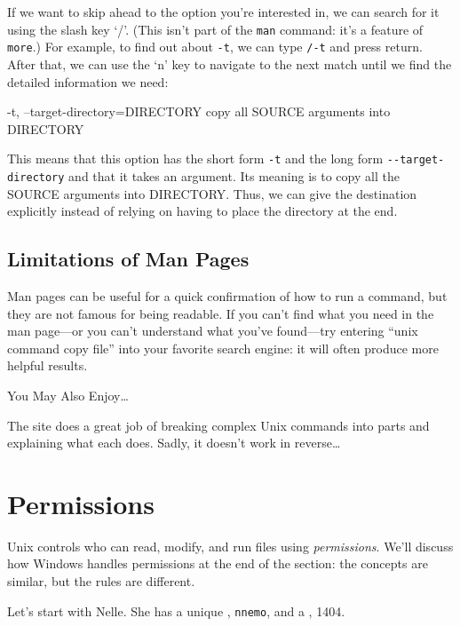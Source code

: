 If we want to skip ahead to the option you're interested in, we can
search for it using the slash key `/'. (This isn't part of the
\texttt{man} command: it's a feature of \texttt{more}.) For example, to
find out about \texttt{-t}, we can type \texttt{/-t} and press return.
After that, we can use the `n' key to navigate to the next match until
we find the detailed information we need:

\begin{VerbOut}
-t, --target-directory=DIRECTORY
     copy all SOURCE arguments into DIRECTORY
\end{VerbOut}

This means that this option has the short form \texttt{-t} and the long
form \texttt{-{}-target-directory} and that it takes an argument. Its
meaning is to copy all the SOURCE arguments into DIRECTORY. Thus, we can
give the destination explicitly instead of relying on having to place
the directory at the end.

\subsection*{Limitations of Man Pages}

Man pages can be useful for a quick confirmation of how to run a
command, but they are not famous for being readable. If you can't find
what you need in the man page---or you can't understand what you've
found---try entering ``unix command copy file'' into your favorite
search engine: it will often produce more helpful results.

\begin{swcbox}{You May Also Enjoy\ldots{}}

The  site does a great
job of breaking complex Unix commands into parts and explaining what
each does. Sadly, it doesn't work in reverse\ldots{}

\end{swcbox}

\section{Permissions}

Unix controls who can read, modify, and run files using
\emph{permissions}. We'll discuss how Windows handles permissions at the
end of the section: the concepts are similar, but the rules are
different.

Let's start with Nelle. She has a unique , \texttt{nnemo}, and a , 1404.

